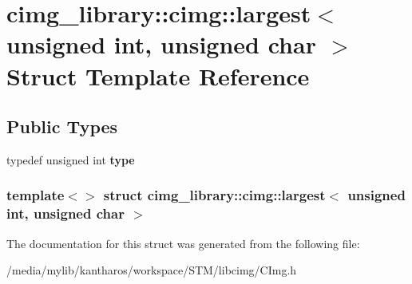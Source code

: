 \hypertarget{structcimg__library_1_1cimg_1_1largest_3_01unsigned_01int_00_01unsigned_01char_01_4}{
\section{cimg\_\-library::cimg::largest$<$ unsigned int, unsigned char $>$ Struct Template Reference}
\label{structcimg__library_1_1cimg_1_1largest_3_01unsigned_01int_00_01unsigned_01char_01_4}
}
\subsection*{Public Types}
\begin{DoxyCompactItemize}
\item 
\hypertarget{structcimg__library_1_1cimg_1_1largest_3_01unsigned_01int_00_01unsigned_01char_01_4_a086fc6235eb470b381aa5abf792bbfbc}{
typedef unsigned int {\bfseries type}}
\label{structcimg__library_1_1cimg_1_1largest_3_01unsigned_01int_00_01unsigned_01char_01_4_a086fc6235eb470b381aa5abf792bbfbc}

\end{DoxyCompactItemize}
\subsubsection*{template$<$$>$ struct cimg\_\-library::cimg::largest$<$ unsigned int, unsigned char $>$}



The documentation for this struct was generated from the following file:\begin{DoxyCompactItemize}
\item 
/media/mylib/kantharos/workspace/STM/libcimg/CImg.h\end{DoxyCompactItemize}
